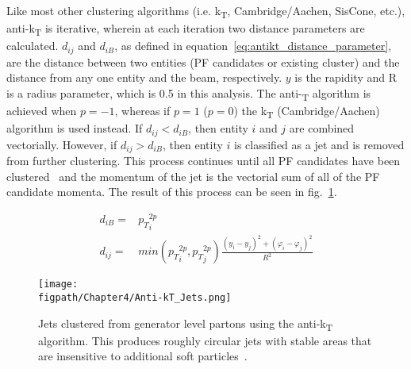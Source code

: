 Like most other clustering algorithms (i.e. k\textsubscript{T}, Cambridge/Aachen, SisCone, etc.), anti-k\textsubscript{T} is iterative, wherein at each iteration two distance parameters are calculated.
$d_{ij}$ and $d_{iB}$, as defined in equation~\ref{eq:antikt_distance_parameter}, are the distance between two entities (PF candidates or existing cluster) and the distance from any one entity and the beam, respectively.
$y$ is the rapidity and R is a radius parameter, which is 0.5 in this analysis.
The anti-\textsubscript{T} algorithm is achieved when $p=-1$, whereas if $p=1$ ($p=0$) the k\textsubscript{T} (Cambridge/Aachen) algorithm is used instead.
If $d_{ij}<d_{iB}$, then entity $i$ and $j$ are combined vectorially.
However, if $d_{ij}>d_{iB}$, then entity $i$ is classified as a jet and is removed from further clustering.
This process continues until all PF candidates have been clustered~\cite{Cacciari:2008gp} and the momentum of the jet is the vectorial sum of all of the PF candidate momenta.
The result of this process can be seen in fig.~\ref{fig:anti-kT_jets}.

\begin{subequations}
    \label{eq:antikt_distance_parameter}
    \begin{align}
\label{eq:antikt_distance_parameter_1}d_{iB}={}&{p_{T}}_{i}^{2p}\\
\label{eq:antikt_distance_parameter_2}d_{ij}={}&min\left({p_{T}}_{i}^{2p},{p_{T}}_{j}^{2p}\right)\frac{\left(y_{i}-y_{j}\right)^{2}+\left(\varphi_{i}-\varphi_{j}\right)^{2}}{R^{2}}
    \end{align}
\end{subequations}

\begin{figure}[!hbt]
    \centering
    \texttt{[image: \\figpath/Chapter4/Anti-kT\_Jets.png]}
    \caption{Jets clustered from generator level partons using the anti-k\textsubscript{T} algorithm. This produces roughly circular jets with stable areas that are insensitive to additional soft particles~\cite{Cacciari:2008gp}.}
    \label{fig:anti-kT_jets}
\end{figure}

